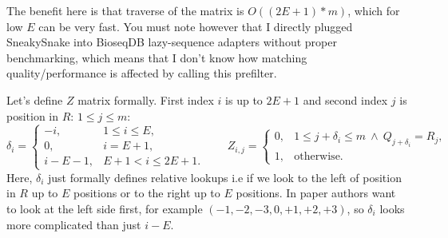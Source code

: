 The benefit here is that traverse of the matrix is $O((2E+1)*m)$, which for low $E$ can be very fast. You must note however that I directly plugged SneakySnake into 
BioseqDB lazy-sequence adapters without proper benchmarking, which means that I don't know how matching quality/performance is affected by calling this prefilter.

Let's define $Z$ matrix formally. First index $i$ is up to $2E+1$ and second index $j$ is position in $R$: \(1\leq j\leq m\):
\[
 \delta_i=\begin{cases}
  -i,&1\leq i\leq E,\\
  0,&i=E+1,\\
  i-E-1,&E+1<i\leq2E+1.
 \end{cases}
 \qquad
 Z_{i,j}=\begin{cases}
  0,&1\leq j+\delta_i\leq m\ \land\ Q_{j+\delta_i}=R_j,\\
  1,&\text{otherwise}.
 \end{cases}
\]
Here, $\delta_i$ just formally defines relative lookups i.e if we look to the left of position in $R$ up to $E$ positions or to the right up to $E$ positions.
In paper authors want to look at the left side first, for example $(-1, -2, -3, 0, +1, +2, +3)$, so $\delta_i$ looks more complicated than just $i-E$.

